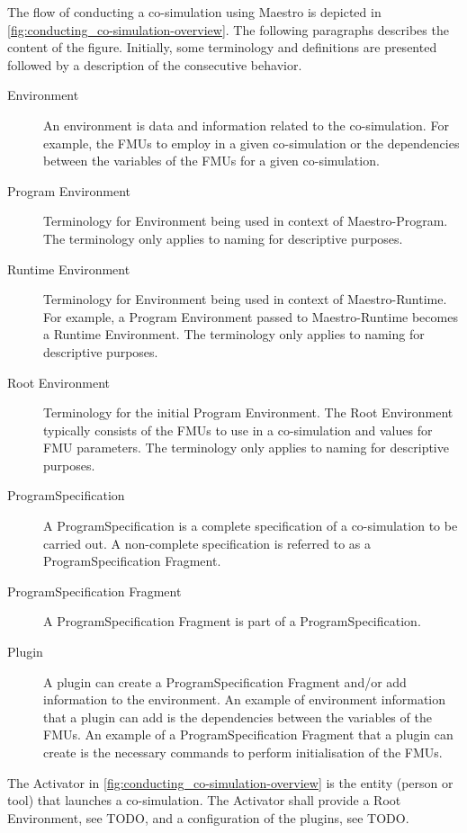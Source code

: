 The flow of conducting a co-simulation using Maestro is depicted in
\cref{fig:conducting_co-simulation-overview}. The following paragraphs describes
the content of the figure. Initially, some terminology and definitions are
presented followed by a description of the consecutive behavior.
\begin{description}
  \item[Environment] An environment is data and information related to the
    co-simulation. For example, the FMUs to employ in a given co-simulation or the dependencies between the variables of the FMUs for a
    given co-simulation.
    \item[Program Environment] Terminology for Environment being used in context
    of Maestro-Program. The terminology only applies to naming for descriptive purposes.
    \item[Runtime Environment] Terminology for Environment being used in context
    of Maestro-Runtime. For example, a Program Environment passed to
    Maestro-Runtime becomes a Runtime Environment. The terminology only applies to naming for descriptive purposes.
    \item[Root Environment] Terminology for the initial Program Environment. The
    Root Environment typically consists of the FMUs to use in a co-simulation and values for FMU
    parameters. The terminology only applies to naming for descriptive purposes.
    \item[ProgramSpecification] A ProgramSpecification is a complete
    specification of a co-simulation to be carried out. A non-complete
    specification is referred to as a ProgramSpecification Fragment.
  \item[ProgramSpecification Fragment] A ProgramSpecification Fragment is part
    of a ProgramSpecification.
  \item[Plugin] A plugin can create a ProgramSpecification Fragment and/or add
    information to the environment. An example of environment information that a
    plugin can add is the dependencies between the variables of the FMUs. An example
    of a ProgramSpecification Fragment that a plugin can create is the necessary
    commands to perform initialisation of the FMUs.
\end{description}

The Activator in \cref{fig:conducting_co-simulation-overview} is the entity
(person or tool) that launches a co-simulation. The Activator shall provide a
Root Environment, see TODO, and a configuration of the plugins, see TODO.

